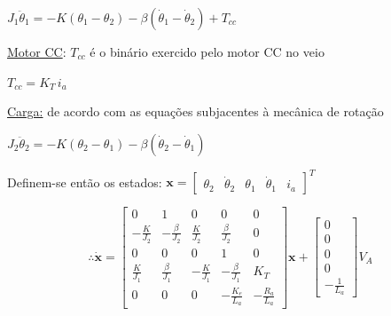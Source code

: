 \noindent \hspace*{1.5 em}\raisebox{0.2 em}{$\drsh$} $J_1 \ddot{\theta}_1 = -K(\theta_1 - \theta_2) -\beta(\dot{\theta}_1 - \dot{\theta}_2) + T_{cc}$

\vspace{0.5em}
\noindent\underline{Motor CC}: $T_{cc}$ é o binário exercido pelo motor CC no veio

\noindent \hspace*{1.5 em}\raisebox{0.2 em}{$\drsh$} $T_{cc} = K_T\, i_a$

\vspace{0.5em}
\noindent \underline{Carga:} de acordo com as equações subjacentes à mecânica de rotação

\noindent \hspace*{1.5 em}\raisebox{0.2 em}{$\drsh$} $J_2 \ddot{\theta}_2 = -K(\theta_2 - \theta_1) -\beta(\dot{\theta}_2 - \dot{\theta}_1)$

\vspace{0.5em}
\noindent Definem-se então os estados: $\pmb{x} = \begin{bmatrix} \theta_2 & \dot{\theta}_2 & \theta_1 & \dot{\theta}_1 & i_a\end{bmatrix}^T$

$$
    \therefore \dot{\pmb{x}} = 
    \begin{bmatrix} 
        0 & 1 & 0 & 0 & 0\\[4pt]
        -\frac{K}{J_2} & -\frac{\beta}{J_2} & \frac{K}{J_2} & \frac{\beta}{J_2} & 0\\[4pt]
        0 & 0 & 0 & 1 & 0\\[4pt]
        \frac{K}{J_1} & \frac{\beta}{J_1} & -\frac{K}{J_1} & -\frac{\beta}{J_1} & K_T\\[4pt]
        0 & 0 & 0 & -\frac{K_e}{L_a} & -\frac{R_a}{L_a}
    \end{bmatrix}
    \pmb{x} +
    \begin{bmatrix} 
        0\\
        0\\
        0\\
        0\\
        -\frac{1}{L_a}
    \end{bmatrix}
    V_A
$$

\clearpage
